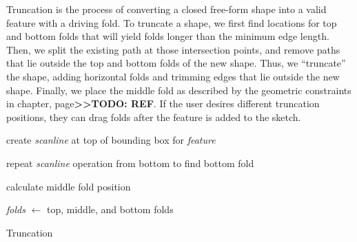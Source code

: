 Truncation is the process of converting a closed free-form shape into a
valid feature with a driving fold. To truncate a shape, we first find
locations for top and bottom folds that will yield folds longer than the
minimum edge length. Then, we split the existing path at those
intersection points, and remove paths that lie outside the top and
bottom folds of the new shape. Thus, we ``truncate'' the shape, adding
horizontal folds and trimming edges that lie outside the new shape.
Finally, we place the middle fold as described by the geometric
constraints in chapter, page\textbf{\textgreater{}\textgreater{}TODO:
REF}. If the user desires different truncation positions, they can drag
folds after the feature is added to the sketch.

\begin{algorithm}[H]



create \textit{scanline} at top of bounding box for \textit{feature}

 
repeat \textit{scanline} operation from bottom to find bottom fold
    
calculate middle fold position
    
\textit{folds} $\leftarrow$ top, middle, and bottom folds
    

\caption{Truncation}
\end{algorithm}

